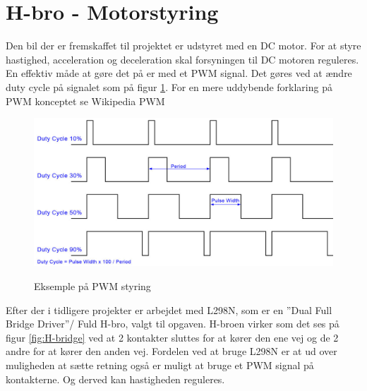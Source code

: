 \section{H-bro - Motorstyring}

Den bil der er fremskaffet til projektet er udstyret med en DC motor. For at styre hastighed, acceleration og deceleration skal forsyningen til DC motoren reguleres. En effektiv måde at gøre det på er med et PWM signal. Det gøres ved at ændre duty cycle på signalet som på figur \ref{fig:PWMpic}. For en mere uddybende forklaring på PWM konceptet se Wikipedia PWM \cite{lib:wikiPWM}

\begin{figure}[h]
	\centering
	\includegraphics[width=\textwidth* 6/10]{../fig/billeder/pwm_lrg}
	\label{fig:PWMpic}
	\caption{Eksemple på PWM styring}
\end{figure}

Efter der i tidligere projekter er arbejdet med L298N\cite{lib:L298N_datablad}, som er en ''Dual Full Bridge Driver''/ Fuld H-bro, valgt til opgaven. H-broen virker som det ses på figur \ref{fig:H-bridge} ved at 2 kontakter sluttes for at kører den ene vej og de 2 andre for at kører den anden vej. Fordelen ved at bruge L298N er at ud over muligheden at sætte retning også er muligt at bruge et PWM signal på kontakterne. Og derved kan hastigheden reguleres.


